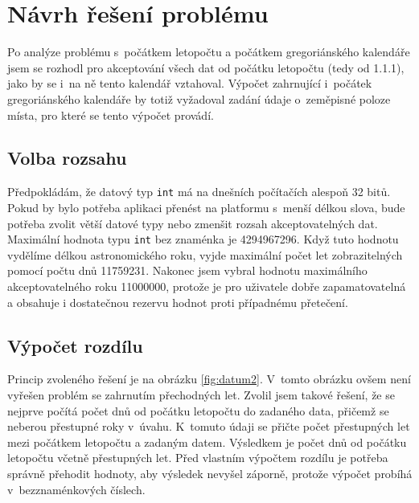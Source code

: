 \documentclass[12pt,a4paper,titlepage,final]{article}
\begin{document}
\section{Návrh řešení problému} \label{navrh}

Po analýze problému s~počátkem letopočtu a počátkem gregoriánského kalendáře
jsem se rozhodl pro akceptování všech dat od počátku letopočtu (tedy od 1.1.1),
jako by se i~na ně tento kalendář vztahoval. Výpočet zahrnující i~počátek
gregoriánského kalendáře by totiž vyžadoval zadání údaje o~zeměpisné poloze
místa, pro které se tento výpočet provádí.

\subsection{Volba rozsahu}\label{rozsah}

Předpokládám, že datový typ \texttt{int} má na dnešních počítačích alespoň 32
bitů. Pokud by bylo potřeba aplikaci přenést na platformu s~menší délkou slova,
bude potřeba zvolit větší datové typy nebo zmenšit rozsah akceptovatelných dat.
Maximální hodnota typu \texttt{int} bez znaménka je 4294967296. Když tuto
hodnotu vydělíme délkou astronomického roku, vyjde maximální počet let
zobrazitelných pomocí počtu dnů 11759231. Nakonec jsem vybral hodnotu
maximálního akceptovatelného roku 11000000, protože je pro uživatele dobře
zapamatovatelná a obsahuje i dostatečnou rezervu hodnot proti případnému
přetečení.

\subsection{Výpočet rozdílu}

Princip zvoleného řešení je na obrázku \ref{fig:datum2}. V~tomto obrázku ovšem
není vyřešen problém se zahrnutím přechodných let. Zvolil jsem takové řešení,
že se nejprve počítá počet dnů od počátku letopočtu do zadaného data, přičemž
se neberou přestupné roky v~úvahu.  K~tomuto údaji se přičte počet přestupných
let mezi počátkem letopočtu a zadaným datem. Výsledkem je počet dnů od počátku
letopočtu včetně přestupných let. Před vlastním výpočtem rozdílu je potřeba
správně přehodit hodnoty, aby výsledek nevyšel záporně, protože výpočet probíhá
v~bezznaménkových číslech.
\end{document}
